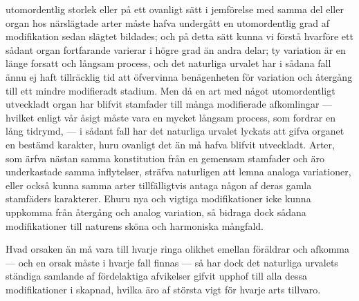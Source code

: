 utomordentlig storlek eller på ett ovanligt sätt i jemförelse med samma del eller organ hos närslägtade arter måste hafva undergått en utomordentlig grad af modifikation sedan slägtet bildades; och på detta sätt kunna vi förstå hvarföre ett sådant organ fortfarande varierar i högre grad än andra delar; ty variation är en länge forsatt och långsam process, och det naturliga urvalet har i sådana fall ännu ej haft tillräcklig tid att öfvervinna benägenheten för variation och återgång till ett mindre modifieradt stadium. Men då en art med något utomordentligt utveckladt organ har blifvit stamfader till många modifierade afkomlingar — hvilket enligt vår åsigt måste vara en mycket långsam process, som fordrar en lång tidrymd, — i sådant fall har det naturliga urvalet lyckats att gifva organet en bestämd karakter, huru ovanligt det än må hafva blifvit utveckladt. Arter, som ärfva nästan samma konstitution från en gemensam stamfader och äro underkastade samma inflytelser, sträfva naturligen att lemna analoga variationer, eller också kunna samma arter tillfälligtvis antaga någon af deras gamla stamfäders karakterer. Ehuru nya och vigtiga modifikationer icke kunna uppkomma från återgång och analog variation, så bidraga dock sådana modifikationer till naturens sköna och harmoniska mångfald.

Hvad orsaken än må vara till hvarje ringa olikhet emellan föräldrar och afkomma — och en orsak måste i hvarje fall finnas — så har dock det naturliga urvalets ständiga samlande af fördelaktiga afvikelser gifvit upphof till alla dessa modifikationer i skapnad, hvilka äro af största vigt för hvarje arts tillvaro.


